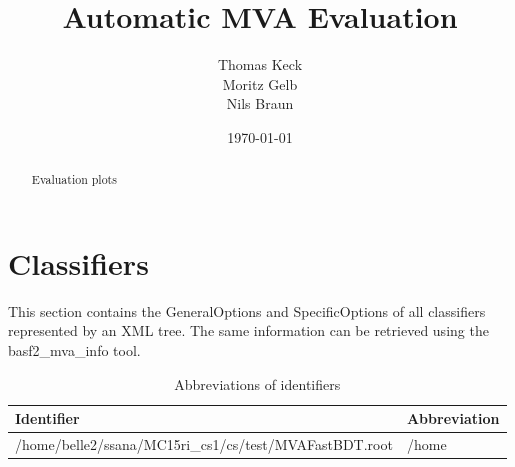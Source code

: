 \documentclass[10pt,a4paper]{article}
\begin{document}
            \author{Thomas Keck\\ Moritz Gelb\\ Nils Braun\\}
\date{\today}
\title{Automatic MVA Evaluation}
\maketitle
\begin{abstract}
Evaluation plots
\end{abstract}
\clearpage
\tableofcontents
\FloatBarrier
\clearpage
\raggedbottom
\pagebreak[0]
\FloatBarrier
\section{Classifiers}

            This section contains the GeneralOptions and SpecificOptions of all classifiers represented by an XML tree.
            The same information can be retrieved using the basf2\_mva\_info tool.
        \begin{center}
\begin{longtable}{ll}
\caption{Abbreviations of identifiers}\\
\toprule
Identifier & Abbreviation\\
\midrule
/home/belle2/ssana/MC15ri\_cs1/cs/test/MVAFastBDT.root & /home\\
\bottomrule
\end{longtable}
\end{center}
\end{document}
